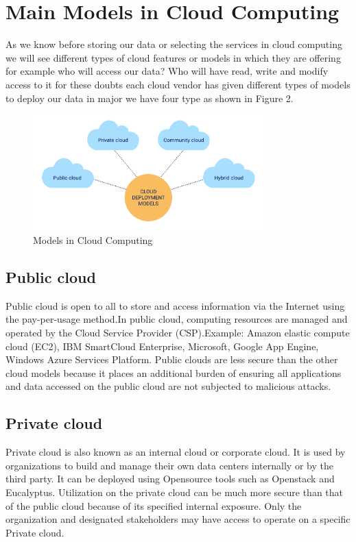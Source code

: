 \documentclass[conference]{IEEEtran}
\begin{document}
\section{Main Models in Cloud Computing}
As we know before storing our data or selecting the services in cloud computing we will see different types of cloud features or models in which they are offering for example who will access our data? Who will have read, write and modify access to it for these doubts each cloud vendor has given different types of models to deploy our data in major we have four type as shown in Figure 2.


\begin{figure}[ht!] %
\centering
\includegraphics[width=3.5in]{Cloud-Deployment-Models_fig1.png}
\caption{Models in Cloud Computing}
\label{Courant_2}
\end{figure}

\subsection{Public cloud}
Public cloud is open to all to store and access information via the Internet using the pay-per-usage method.In public cloud, computing resources are managed and operated by the Cloud Service Provider (CSP).Example: Amazon elastic compute cloud (EC2), IBM SmartCloud Enterprise, Microsoft, Google App Engine, Windows Azure Services Platform. Public clouds are less secure than the other cloud models because it places an additional burden of ensuring all applications and data accessed on the public cloud are not subjected to malicious attacks.

\subsection{Private cloud}
Private cloud is also known as an internal cloud or corporate cloud. It is used by organizations to build and manage their own data centers internally or by the third party. It can be deployed using Opensource tools such as Openstack and Eucalyptus. Utilization on the private cloud can be much more secure than that of the public cloud because of its specified internal exposure. Only the organization and designated stakeholders may have access to operate on a specific Private cloud.
\end{document}
